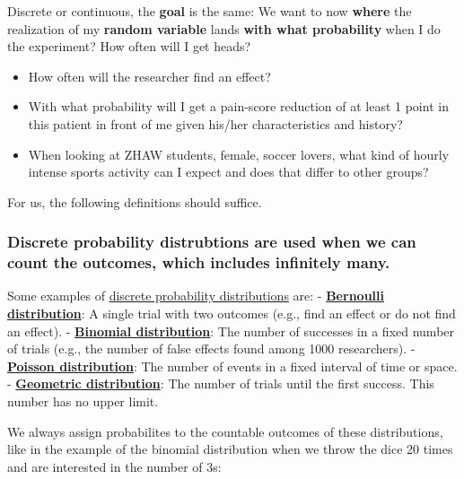 \documentclass[
]{book}
\begin{document}
Discrete or continuous, the \textbf{goal} is the same: We want to now \textbf{where} the realization of my \textbf{random variable} lands \textbf{with what probability}
when I do the experiment?
How often will I get heads?

\begin{itemize}
\item
  How often will the researcher find an effect?
\item
  With what probability will I get a pain-score reduction of at least 1 point in this patient in front of me given his/her
  characteristics and history?
\item
  When looking at ZHAW students, female, soccer lovers, what kind of hourly intense sports activity can I expect and does that differ to other groups?
\end{itemize}

For us, the following definitions should suffice.

\subsubsection{Discrete probability distrubtions are used when we can count the outcomes, which includes infinitely many.}\label{discrete_probability_distributions}

Some examples of \href{https://en.wikipedia.org/wiki/Probability_distribution\#Discrete_probability_distribution}{discrete probability distributions} are:
- \textbf{\href{https://en.wikipedia.org/wiki/Bernoulli_distribution}{Bernoulli distribution}}: A single trial with two outcomes (e.g., find an effect or do not find an effect).
- \textbf{\href{https://en.wikipedia.org/wiki/Binomial_distribution}{Binomial distribution}}: The number of successes in a fixed number of trials (e.g., the number of false effects found among 1000 researchers).
- \textbf{\href{https://en.wikipedia.org/wiki/Poisson_distribution}{Poisson distribution}}: The number of events in a fixed interval of time or space.
- \textbf{\href{https://en.wikipedia.org/wiki/Geometric_distribution}{Geometric distribution}}: The number of trials until the first success. This number has no upper limit.

We always assign probabilites to the countable outcomes of these distributions, like in the example of the binomial distribution when
we throw the dice 20 times and are interested in the number of 3s:
\end{document}
